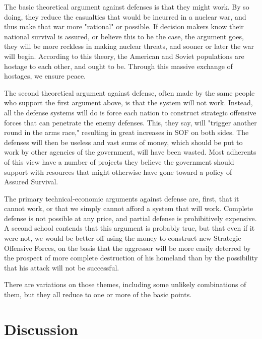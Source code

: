 The basic theoretical argument against defenses is that they might work. By so doing, they reduce the casualties that would be incurred in a nuclear war, and thus make that war more "rational" or possible. If decision makers know their national survival is assured, or believe this to be the case, the argument goes, they will be more reckless in making nuclear threats, and sooner or later the war will begin. According to this theory, the American and Soviet populations are hostage to each other, and ought to be. Through this massive exchange of hostages, we ensure peace.

The second theoretical argument against defense, often made by the same people who support the first argument above, is that the system will not work. Instead, all the defense systems will do is force each nation to construct strategic offensive forces that can penetrate the enemy defenses. This, they say, will "trigger another round in the arms race," resulting in great increases in SOF on both sides. The defenses will then be useless and vast sums of money, which should be put to work by other agencies of the government, will have been wasted. Most adherents of this view have a number of projects they believe the government should support with resources that might otherwise have gone toward a policy of Assured Survival.

The primary technical-economic arguments against defense are, first, that it cannot work, or that we simply cannot afford a system that will work. Complete defense is not possible at any price, and partial defense is prohibitively expensive. A second school contends that this argument is probably true, but that even if it were not, we would be better off using the money to construct new Strategic Offensive Forces, on the basis that the aggressor will be more easily deterred by the prospect of more complete destruction of his homeland than by the possibility that his attack will not be successful.

There are variations on those themes, including some unlikely combinations of them, but they all reduce to one or more of the basic points.

\section{Discussion}

